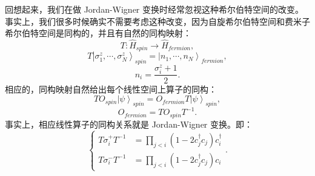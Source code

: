 \documentclass[10pt,UTF8]{ctexart}
\begin{document}
回想起来，我们在做 Jordan-Wigner 变换时经常忽视这种希尔伯特空间的改变。事实上，我们很多时候确实不需要考虑这种改变，因为自旋希尔伯特空间和费米子希尔伯特空间是同构的，并且有自然的同构映射：
\begin{equation}
	T:\hat H_{spin}\rightarrow \hat{H}_{fermion},
\end{equation}
\begin{equation}
	T\left|\sigma_{1}^{z},\cdots,\sigma_{N}^{z}\right\rangle _{spin}=\left|n_{1},\cdots,n_{N}\right\rangle _{fermion},
\end{equation}
\begin{equation}
	n_{i}=\frac{\sigma_{i}^{z}+1}{2}.
\end{equation}
相应的，同构映射自然给出每个线性空间上算子的同构：
\begin{equation}
	TO_{spin}\left|\psi\right\rangle _{spin}=O_{fermion}T\left|\psi\right\rangle _{spin},
\end{equation}
\begin{equation}
	O_{fermion}=TO_{spin}T^{-1}.
\end{equation}
事实上，相应线性算子的同构关系就是 Jordan-Wigner 变换。即：
\begin{equation}
	\begin{cases} T\sigma_{i}^{+}T^{-1} & =\prod_{j<i}\left(1-2c_{j}^{\dagger}c_{j}\right)c_{i}^{\dagger}\\ T\sigma_{i}^{-}T^{-1} & =\prod_{j<i}\left(1-2c_{j}^{\dagger}c_{j}\right)c_{i} \end{cases}.
\end{equation}
\end{document}
